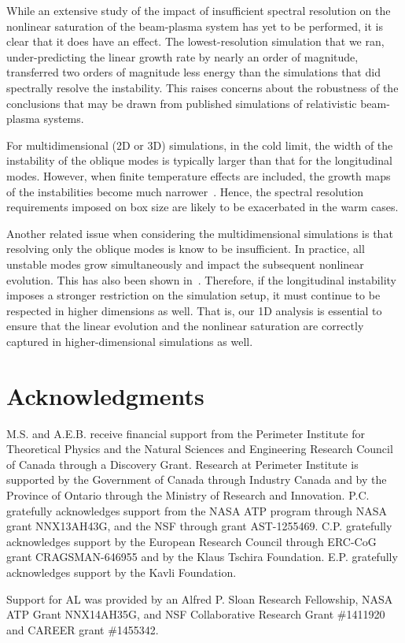 \documentclass[pop,numberedappendix,iop]{aeb_emulateapj_2015}
\begin{document}
While an extensive study of the impact of insufficient spectral resolution on the nonlinear saturation of the beam-plasma system has yet to be performed, it is clear that it does have an effect.
The lowest-resolution simulation that we ran, under-predicting the linear growth rate by nearly an order of magnitude, transferred two orders of magnitude less energy than the simulations that did spectrally resolve the instability.
This raises concerns about the robustness of the conclusions that may be drawn from published simulations of relativistic beam-plasma systems.



For multidimensional (2D or 3D) simulations, in the cold limit, the width of the  instability of the oblique modes is typically larger than that for the longitudinal modes.
However, when finite temperature effects are included, the growth maps of the instabilities become much narrower~\citep[see, e.g.,  the various panels in Figure 17 of ][]{Bret2010}.
Hence, the spectral resolution requirements imposed on box size are likely to be exacerbated in the warm cases.

Another related issue when considering the multidimensional simulations is that resolving only the oblique modes is know to be insufficient. 
In practice, all unstable modes grow simultaneously and impact the subsequent nonlinear evolution. 
This has also been shown in~\citet[][see especially the discussion in Section V.D]{Bret2010}.
Therefore, if the longitudinal instability imposes a stronger restriction on the simulation setup, it must continue to be respected in higher dimensions as well.
That is, our 1D analysis is essential to ensure that the linear evolution and the nonlinear saturation are correctly captured in higher-dimensional simulations as well.
 
\section*{Acknowledgments}


M.S. and A.E.B. receive financial support from the Perimeter Institute for Theoretical Physics and the Natural Sciences and Engineering Research Council of Canada through a Discovery Grant. Research at Perimeter Institute is supported by the Government of Canada through Industry Canada and by the Province of Ontario through the Ministry of Research and Innovation.
P.C. gratefully acknowledges support from the NASA ATP program through NASA grant NNX13AH43G, and the NSF through grant AST-1255469.
C.P. gratefully acknowledges support by the European Research Council through ERC-CoG grant CRAGSMAN-646955 and by the Klaus Tschira Foundation.
E.P. gratefully acknowledges support by the Kavli Foundation.

Support for AL was provided by an Alfred P. Sloan Research Fellowship, NASA ATP Grant NNX14AH35G, and NSF Collaborative Research Grant \#1411920 and CAREER grant \#1455342.







\end{document}
